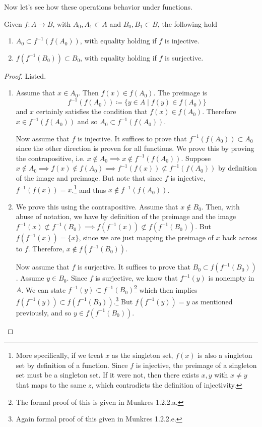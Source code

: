   Now let's see how these operations behavior under functions. 

  \begin{theorem}
    Given $f: A \rightarrow B$, with $A_0, A_1 \subset A$ and $B_0, B_1 \subset B$, the following hold 
    \begin{enumerate}
      \item $A_0 \subset f^{-1} (f(A_0))$, with equality holding if $f$ is injective. 
      \item $f(f^{-1}(B_0)) \subset B_0$, with equality holding if $f$ is surjective. 
    \end{enumerate}
  \end{theorem} 
  \begin{proof} 
    Listed. 
    \begin{enumerate}
      \item Assume that $x \in A_0$. Then $f(x) \in f(A_0)$. The preimage is 
      \begin{equation}
        f^{-1} (f(A_0)) \coloneqq \{ y \in A \mid f(y) \in f(A_0) \}
      \end{equation}
      and $x$ certainly satisfies the condition that $f(x) \in f(A_0)$. Therefore $x \in f^{-1} (f(A_0))$ and so $A_0 \subset f^{-1} (f(A_0))$. 

      Now assume that $f$ is injective. It suffices to prove that $f^{-1} (f(A_0)) \subset A_0$ since the other direction is proven for all functions. We prove this by proving the contrapositive, i.e. $x \not\in A_0 \implies x \not\in f^{-1} (f(A_0))$. Suppose $x \not\in A_0 \implies f(x) \not\in f(A_0) \implies f^{-1} (f(x)) \not\subset f^{-1} (f(A_0))$ by definition of the image and preimage. But note that since $f$ is injective, $f^{-1} (f(x)) = x$.\footnote{More specifically, if we treat $x$ as the singleton set, $f(x)$ is also a singleton set by definition of a function. Since $f$ is injective, the preimage of a singleton set must be a singleton set. If it were not, then there exists $x, y$ with $x \neq y$ that maps to the same $z$, which contradicts the definition of injectivity.} and thus $x \not\in f^{-1} (f(A_0))$. 

      \item We prove this using the contrapositive. Assume that $x \not\in B_0$. Then, with abuse of notation, we have by definition of the preimage and the image $f^{-1} (x) \not\subset f^{-1} (B_0) \implies f(f^{-1} (x)) \not\subset f(f^{-1}(B_0))$. But $f (f^{-1} (x)) = \{x\}$, since we are just mapping the preimage of $x$ back across to $f$. Therefore, $x \notin f( f^{-1} (B_0))$. 

      Now assume that $f$ is surjective. It suffices to prove that $B_0 \subset f (f^{-1}(B_0))$. Assume $y \in B_0$. Since $f$ is surjective, we know that $f^{-1} (y)$ is nonempty in $A$. We can state $f^{-1}(y) \subset f^{-1} (B_0)$\footnote{The formal proof of this is given in Munkres 1.2.2.a.} which then implies $f(f^{-1} (y)) \subset f (f^{-1} (B_0))$.\footnote{Again formal proof of this given in Munkres 1.2.2.e.} But $f (f^{-1} (y)) = y$ as mentioned previously, and so $y \in f(f^{-1} (B_0))$. 
    \end{enumerate}
  \end{proof}

